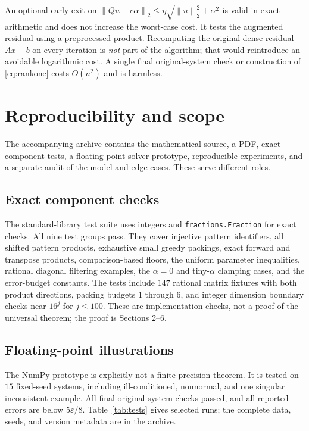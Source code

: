 \documentclass[11pt,a4paper]{article}
\theoremstyle{remark}
\newcommand{\eps}{\varepsilon}
\newcommand{\norm}[1]{\left\|#1\right\|_2}
\begin{document}
An optional early exit on
$\norm{Qu-c\alpha}\le\eta\sqrt{\norm{u}^2+\alpha^2}$ is valid in exact
arithmetic and does not increase the worst-case cost. It tests the augmented
residual using a preprocessed product. Recomputing the original dense residual
$Ax-b$ on every iteration is \emph{not} part of the algorithm; that would
reintroduce an avoidable logarithmic cost. A single final original-system
check or construction of \eqref{eq:rankone} costs $O(n^2)$ and is harmless.

\section{Reproducibility and scope}

The accompanying archive contains the mathematical source, a PDF, exact
component tests, a floating-point solver prototype, reproducible experiments,
and a separate audit of the model and edge cases. These serve different roles.

\subsection{Exact component checks}

The standard-library test suite uses integers and \texttt{fractions.Fraction}
for exact checks. All nine test groups pass. They cover injective pattern
identifiers, all shifted pattern products, exhaustive small greedy packings,
exact forward and transpose products, comparison-based floors, the uniform
parameter inequalities, rational diagonal filtering examples, the
$\alpha=0$ and tiny-$\alpha$ clamping cases, and the error-budget constants.
The tests include $147$ rational matrix fixtures with both product directions,
packing budgets $1$ through $6$, and integer dimension boundary checks near
$16^j$ for $j\le100$. These are implementation checks, not a proof of the
universal theorem; the proof is Sections 2--6.

\subsection{Floating-point illustrations}

The NumPy prototype is explicitly not a finite-precision theorem. It is tested
on $15$ fixed-seed systems, including ill-conditioned, nonnormal, and one
singular inconsistent example. All final original-system checks passed, and
all reported errors are below $5\eps/8$. Table~\ref{tab:tests} gives selected
runs; the complete data, seeds, and version metadata are in the archive.
\end{document}
